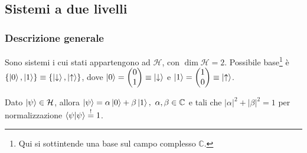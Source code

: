 \documentclass[10pt, a4paper]{scrartcl}
\numberwithin{equation}{subsection}
\theoremstyle{style2}
\theoremstyle{style1}
\begin{document}
\subsection{Sistemi a due livelli}
\subsubsection{Descrizione generale}


Sono sistemi i cui stati appartengono ad $\mathcal{H}$, con $\dim \mathcal{H} = 2$. Possibile base\footnote{Qui si sottintende una base sul campo complesso $\mathbb{C}$.} \`e $\left\{ \ket{0} , \ket{1}  \right\} \equiv \left\{ \ket{\downarrow}, \ket{\uparrow}   \right\} $, dove $\ket{0} = \begin{pmatrix} 0\\ 1 \end{pmatrix} \equiv \ket{\downarrow} $ e $\ket{1} = \begin{pmatrix} 1 \\ 0 \end{pmatrix} \equiv \ket{\uparrow} $.

Dato $\ket{\psi } \in \mathcal{H}$, allora $\ket{\psi } =  \alpha  \ket{0}  + \beta  \ket{1}, \ \alpha ,\beta  \in \mathbb{C} $ e tali che $\lvert \alpha  \rvert ^2 + \lvert \beta  \rvert ^2 = 1$ per normalizzazione $\braket{\psi |\psi } \stackrel{!}{=}1$.
\end{document}
